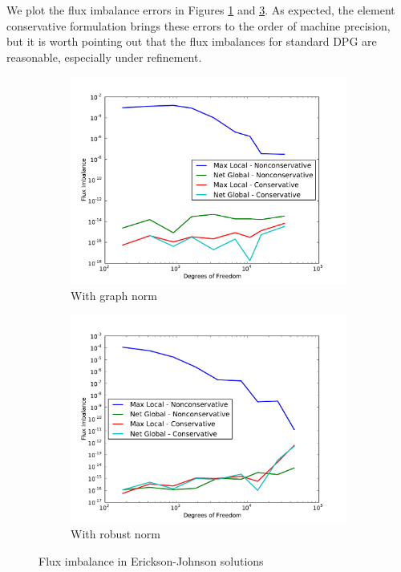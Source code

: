 \documentclass[letterpaper]{article}
\begin{document}
We plot the flux imbalance errors in Figures \ref{fig:ericksonGraphFlux} and
\ref{fig:ericksonRobustFlux}. As expected, the element conservative
formulation brings these errors to the order of machine precision, but it is
worth pointing out that the flux imbalances for standard DPG are reasonable,
especially under refinement.

\begin{figure}
\centering
\begin{subfigure}[t]{0.45\textwidth}
\centering
\includegraphics[width=\textwidth]{figs/Erickson/graphFlux.pdf}
\caption{With graph norm}
\label{fig:ericksonGraphFlux}
\end{subfigure}
\begin{subfigure}[t]{0.45\textwidth}
\centering
\includegraphics[width=\textwidth]{figs/Erickson/robustFlux.pdf}
\caption{With robust norm}
\label{fig:ericksonRobustFlux}
\end{subfigure}
\caption{Flux imbalance in Erickson-Johnson solutions}
\end{figure}
\end{document}
